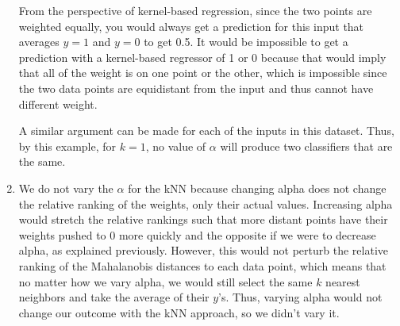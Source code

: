 \documentclass[submit]{harvardml}
\begin{document}
\begin{enumerate}
    From the perspective of kernel-based regression, since the two points are weighted equally, you would always get a prediction for this input that averages $y=1$ and $y=0$ to get 0.5. It would be impossible to get a prediction with a kernel-based regressor of 1 or 0 because that would imply that all of the weight is on one point or the other, which is impossible since the two data points are equidistant from the input and thus cannot have different weight.

    A similar argument can be made for each of the inputs in this dataset. Thus, by this example, for $k=1$, no value of $\alpha$ will produce two classifiers that are the same.

    \item We do not vary the $\alpha$ for the kNN because changing alpha does not change the relative ranking of the weights, only their actual values. Increasing alpha would stretch the relative rankings such that more distant points have their weights pushed to 0 more quickly and the opposite if we were to decrease alpha, as explained previously. However, this would not perturb the relative ranking of the Mahalanobis distances to each data point, which means that no matter how we vary alpha, we would still select the same $k$ nearest neighbors and take the average of their $y$'s. Thus, varying alpha would not change our outcome with the kNN approach, so we didn't vary it.
\end{enumerate}
\newpage

\end{document}
